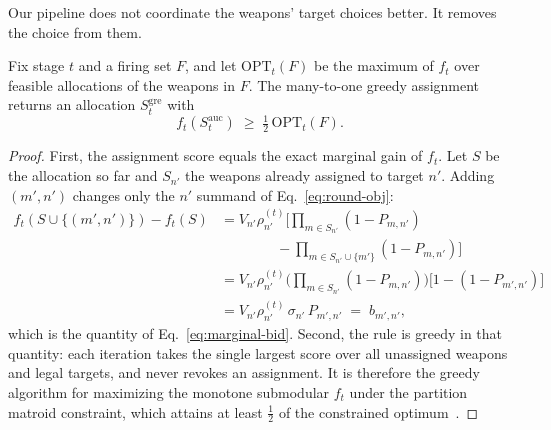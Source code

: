 
Our pipeline does not coordinate the weapons' target choices better. It
removes the choice from them.

\begin{proposition}
\label{prop:auction-half}
Fix stage $t$ and a firing set $F$, and let $\text{OPT}_t(F)$ be the maximum of $f_t$ over feasible allocations of the weapons in $F$. The many-to-one greedy assignment returns an allocation $S^{\text{gre}}_t$ with
\begin{equation}
f_t(S^{\text{auc}}_t) \;\geq\; \tfrac12\,\text{OPT}_t(F).
\end{equation}
\end{proposition}
\begin{proof}
First, the assignment score equals the exact marginal gain of $f_t$. Let $S$ be the allocation so far and $S_{n'}$ the weapons already assigned to target $n'$. Adding $(m',n')$ changes only the $n'$ summand of Eq.~\eqref{eq:round-obj}:
\begin{align*}
f_t(S \cup \{(m',n')\}) - f_t(S)
&= V_{n'}\rho_{n'}^{(t)}\Big[\textstyle\prod_{m \in S_{n'}}(1-P_{m,n'}) \\
&\qquad\qquad - \textstyle\prod_{m \in S_{n'} \cup \{m'\}}(1-P_{m,n'})\Big] \\
&= V_{n'}\rho_{n'}^{(t)} \Big(\textstyle\prod_{m \in S_{n'}}(1-P_{m,n'})\Big)\big[1-(1-P_{m',n'})\big] \\
&= V_{n'}\rho_{n'}^{(t)}\,\sigma_{n'}\,P_{m',n'} \;=\; b_{m',n'},
\end{align*}
which is the quantity of Eq.~\eqref{eq:marginal-bid}. Second, the rule is greedy in that quantity: each iteration takes the single largest score over all unassigned weapons and legal targets, and never revokes an assignment. It is therefore the greedy algorithm for maximizing the monotone submodular $f_t$ under the partition matroid constraint, which attains at least $\tfrac12$ of the constrained optimum~\cite{fisher1978analysis}.
\end{proof}

